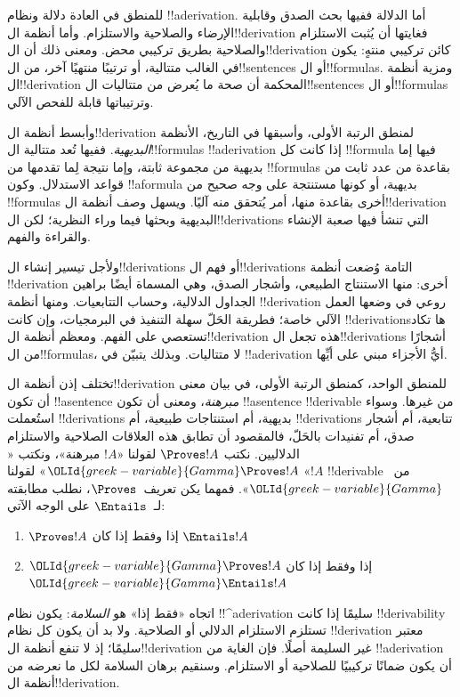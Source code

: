 \documentclass[../../../include/open-logic-section]{subfiles}
\begin{document}
      {}
      {}


للمنطق في العادة دلالة ونظام !!a{derivation}. أما الدلالة ففيها بحث الصدق وقابلية الإرضاء والصلاحية والاستلزام. وأما أنظمة ال!!{derivation} فغايتها أن يُثبت الاستلزام والصلاحية بطريق تركيبي محض. ومعنى ذلك أن ال!!{derivation} كائن تركيبي منتهٍ: يكون في الغالب متتالية، أو ترتيبًا منتهيًا آخر، من ال!!{sentence}s أو ال!!{formula}s. ومزية أنظمة ال!!{derivation} المحكمة أن صحة ما يُعرض من متتاليات ال!!{sentence}s أو ال!!{formula}s وترتيباتها قابلة للفحص الآلي.

وأبسط أنظمة ال!!{derivation} لمنطق الرتبة الأولى، وأسبقها في التاريخ، الأنظمة \emph{البديهية}. ففيها تُعد متتالية ال!!{formula}s
!!a{derivation} إذا كانت كل !!{formula} فيها إما بديهية من مجموعة ثابتة، وإما نتيجة لِما تقدمها من !!{formula}s بقاعدة من عدد ثابت من قواعد الاستدلال. وكون
!!a{formula} بديهية، أو كونها مستنتجة على وجه صحيح من !!{formula}s أخرى بقاعدة منها، أمر يُتحقق منه آليًا. ويسهل وصف أنظمة ال!!{derivation} البديهية وبحثها فيما وراء النظرية؛ لكن ال!!{derivation}s التي تنشأ فيها صعبة الإنشاء والقراءة والفهم.

ولأجل تيسير إنشاء ال!!{derivation}s أو فهم ال!!{derivation}s التامة وُضعت أنظمة
!!{derivation} أخرى: منها الاستنتاج الطبيعي، وأشجار الصدق، وهي المسماة أيضًا براهين الجداول الدلالية، وحساب التتابعيات. ومنها أنظمة
!!{derivation} روعي في وضعها العمل الآلي خاصة؛ فطريقة الحَلّ سهلة التنفيذ في البرمجيات، وإن كانت !!{derivation}sها تكاد تستعصي على الفهم. ومعظم أنظمة ال!!{derivation} هذه تجعل ال!!{derivation}s أشجارًا من ال!!{formula}s، لا متتاليات. وبذلك يتبيّن في
!!a{derivation} أيُّ الأجزاء مبني على أيِّها.

تختلف إذن أنظمة ال!!{derivation} للمنطق الواحد، كمنطق الرتبة الأولى، في بيان معنى أن تكون
!!a{sentence} \emph{مبرهنة}، ومعنى أن تكون
!!a{sentence} !!{derivable} من غيرها. وسواء استُعملت
!!{derivation}s بديهية، أم استنتاجات طبيعية، أم
!!{derivation}s تتابعية، أم أشجار صدق، أم تفنيدات بالحَلّ، فالمقصود أن تطابق هذه العلاقات الصلاحية والاستلزام الدلاليين. نكتب
$\Proves !A$ لقولنا «$!A$ مبرهنة»، ونكتب
«$\OLId{greek-variable}{Gamma} \Proves !A$» لقولنا «$!A$ !!{derivable} من~$\OLId{greek-variable}{Gamma}$».
فمهما يكن تعريف~$\Proves$، نطلب مطابقته لـ~$\Entails$ على الوجه الآتي:
\begin{enumerate}
\item $\Proves !A$ إذا وفقط إذا كان $\Entails !A$
\item $\OLId{greek-variable}{Gamma} \Proves !A$ إذا وفقط إذا كان $\OLId{greek-variable}{Gamma} \Entails !A$
\end{enumerate}
اتجاه «فقط إذا» هو \emph{السلامة}: يكون نظام
!!^a{derivation} سليمًا إذا كانت !!{derivability} تستلزم الاستلزام الدلالي أو الصلاحية. ولا بد أن يكون كل نظام
!!{derivation} معتبر سليمًا؛ إذ لا تنفع أنظمة ال!!{derivation} غير السليمة أصلًا. فإن الغاية من
!!a{derivation} أن يكون ضمانًا تركيبيًا للصلاحية أو الاستلزام. وسنقيم برهان السلامة لكل ما نعرضه من أنظمة ال!!{derivation}.
\end{document}
